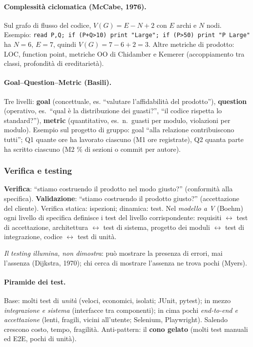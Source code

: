 \documentclass[a4paper,12pt]{article}
\begin{document}
\paragraph{Complessità ciclomatica (McCabe, 1976).} Sul grafo di flusso del codice,
$V(G) = E - N + 2$ con $E$ archi e $N$ nodi. Esempio: \texttt{read P,Q; if (P+Q>10) print
"Large"; if (P>50) print "P Large"} ha $N=6$, $E=7$, quindi $V(G)=7-6+2=3$. Altre metriche
di prodotto: LOC, function point, metriche OO di Chidamber e Kemerer (accoppiamento tra
classi, profondità di ereditarietà).

\paragraph{Goal--Question--Metric (Basili).} Tre livelli: \textbf{goal} (concettuale, es.
``valutare l'affidabilità del prodotto''), \textbf{question} (operativo, es.\ ``qual è la
distribuzione dei guasti?'', ``il codice rispetta lo standard?''), \textbf{metric}
(quantitativo, es.\ n.\ guasti per modulo, violazioni per modulo). Esempio sul progetto di
gruppo: goal ``alla relazione contribuiscono tutti''; Q1 quante ore ha lavorato ciascuno
(M1 ore registrate), Q2 quanta parte ha scritto ciascuno (M2 \% di sezioni o commit per autore).

\subsubsection{Verifica e testing}
\textbf{Verifica}: ``stiamo costruendo il prodotto nel modo giusto?'' (conformità alla
specifica). \textbf{Validazione}: ``stiamo costruendo il prodotto giusto?'' (accettazione del
cliente). Verifica statica: ispezioni; dinamica: test. Nel \emph{modello a V} (Boehm) ogni
livello di specifica definisce i test del livello corrispondente: requisiti $\leftrightarrow$
test di accettazione, architettura $\leftrightarrow$ test di sistema, progetto dei moduli
$\leftrightarrow$ test di integrazione, codice $\leftrightarrow$ test di unità.

\emph{Il testing illumina, non dimostra}: può mostrare la presenza di errori, mai
l'assenza (Dijkstra, 1970); chi cerca di mostrare l'assenza ne trova pochi (Myers).

\paragraph{Piramide dei test.} Base: molti test di \emph{unità} (veloci, economici, isolati;
JUnit, pytest); in mezzo \emph{integrazione e sistema} (interfacce tra componenti);
in cima pochi \emph{end-to-end e accettazione} (lenti, fragili, vicini all'utente; Selenium,
Playwright). Salendo crescono costo, tempo, fragilità. Anti-pattern: il \textbf{cono gelato}
(molti test manuali ed E2E, pochi di unità).
\end{document}
